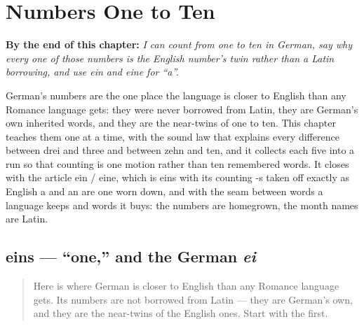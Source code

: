 
\chapter{Numbers One to Ten}
\label{ch:numbers-1-10}

\begin{chapteropening}
\textbf{By the end of this chapter:} \emph{I can count from one to ten in German, say why every one of those numbers is the English number's twin rather than a Latin borrowing, and use ein and eine for \textquotedblleft{}a\textquotedblright{}.}

German's numbers are the one place the language is closer to English than any Romance language gets: they were never borrowed from Latin, they are German's own inherited words, and they are the near-twins of one to ten. This chapter teaches them one at a time, with the sound law that explains every difference between drei and three and between zehn and ten, and it collects each five into a run so that counting is one motion rather than ten remembered words. It closes with the article ein / eine, which is eins with its counting -s taken off exactly as English a and an are one worn down, and with the seam between words a language keeps and words it buys: the numbers are homegrown, the month names are Latin.
\end{chapteropening}

\section[eins]{eins — \textquotedblleft{}one,\textquotedblright{} and the German \emph{ei}}

\label{lesson:GE-C06-eins}



\begin{quote}
Here is where German is closer to English than any Romance language gets. Its numbers are not borrowed from Latin — they are German's own, and they are the near-twins of the English ones. Start with the first.
\end{quote}

